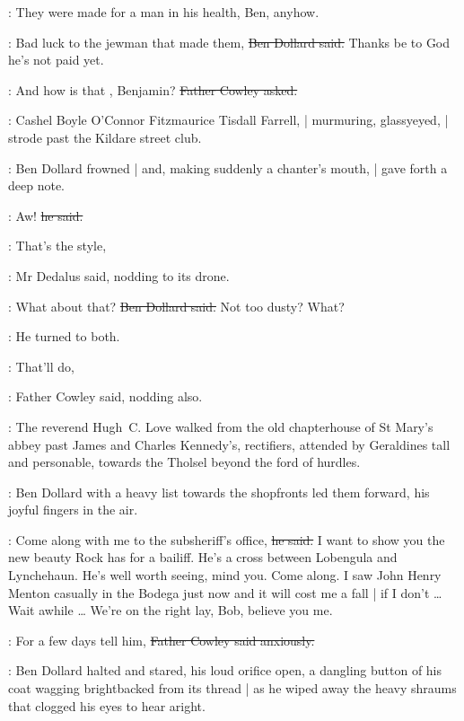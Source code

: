 \simon:
They were made for a man in his health, Ben, anyhow.

\dollard:
Bad luck to the jewman that made them,
\sout{Ben Dollard said.}
Thanks be to God he's not paid yet.

\cowley:
And how is that , Benjamin?
\sout{Father Cowley asked.}

\begin{interject}
    :
    Cashel Boyle O'Connor Fitzmaurice Tisdall Farrell, |
    murmuring, glassy\-eyed, |
    strode past the Kildare street club.
\end{interject}

:
Ben Dollard frowned |
and, making suddenly a chanter's mouth, |
gave forth a deep note.

\dollard:
Aw!
\sout{he said.}

\simon:
That's the style,

:
Mr Dedalus said,
nodding to its drone.

\dollard:
What about that?
\sout{Ben Dollard said.}
Not too dusty?
What?

:
He turned to both.

\cowley:
That'll do,

:
Father Cowley said,
nodding also.

\begin{interject}
    :
    The reverend Hugh~C. Love
    walked from the old chapterhouse of St Mary's abbey
    past James and Charles Kennedy's, rectifiers,
    attended by Geraldines tall and personable,
    towards the Tholsel beyond the ford of hurdles.
\end{interject}

:
Ben Dollard with a heavy list towards the shopfronts
led them forward,
his joyful fingers in the air.

\dollard:
Come along with me to the subsheriff's office,
\sout{he said.}
I want to show you the new beauty Rock has for a bailiff.
He's a cross between Lobengula and Lynchehaun.
He's well worth seeing, mind you.
Come along.
I saw John Henry Menton casually in the Bodega just now
and it will cost me a fall |
if I don't \ldots
Wait awhile \ldots
We're on the right lay, Bob, believe you me.

\cowley:
For a few days tell him,
\sout{Father Cowley said anxiously.}

:
Ben Dollard halted and stared,
his loud orifice open,
a dangling button of his coat wagging brightbacked from its thread |
as he wiped away the heavy shraums that clogged his eyes
to hear aright.

